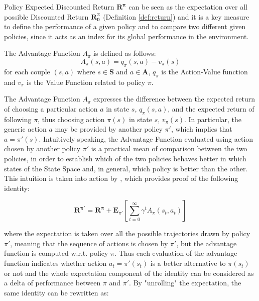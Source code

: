                 Policy Expected Discounted Return $\mathbf{R^{\pi}}$ can be seen as the expectation over all possible Discounted Return $\mathbf{R_{0}^{\pi}}$ (Definition \ref{def:return}) and it is a key measure to define the performance of a given policy and to compare two different given policies, since it acts as an index for its global performance in the environment.
                
                \begin{definition}
                    \label{def:advantagefunction}
                    The Advantage Function $A_{\pi}$ is defined as follows:
                    \[ A_{\pi}\left(s, a\right) = q_{\pi}\left(s, a\right) - v_{\pi}\left(s\right) \]
                    for each couple $(s, a)$ where $s \in \mathbf{S}$ and $a \in \mathbf{A}$, $q_{\pi}$ is the Action-Value function and $v_{\pi}$ is the Value Function related to policy $\pi$.
                \end{definition}
                
                The Advantage Function $A_{\pi}$ expresses the difference between the expected return of choosing a particular action $a$ in state $s$, $q_{\pi}(s, a)$, and the expected return of following $\pi$, thus choosing action $\pi(s)$ in state $s$, $v_{\pi}(s)$. In particular, the generic action $a$ may be provided by another policy $\pi'$, which implies that $a = \pi'(s)$. Intuitively speaking, the Advantage Function evaluated using action chosen by another policy $\pi'$ is a practical mean of comparison between the two policies, in order to establish which of the two policies behaves better in which states of the State Space and, in general, which policy is better than the other. This intuition is taken into action by , which provides proof of the following identity:
                
                \[ \mathbf{R^{\pi'}} = \mathbf{R^{\pi}} + \mathbf{E}_{\pi'} \left[ \sum_{t=0}^\infty \gamma^t A_{\pi}\left(s_t, a_t\right) \right] \]
                
                where the expectation is taken over all the possible trajectories drawn by policy $\pi'$, meaning that the sequence of actions is chosen by $\pi'$, but the advantage function is computed w.r.t. policy $\pi$. Thus each evaluation of the advantage function indicates whether action $a_t = \pi'(s_t)$ is a better alternative to $\pi(s_t)$ or not and the whole expectation component of the identity can be considered as a delta of performance between $\pi$ and $\pi'$. By "unrolling" the expectation, the same identity can be rewritten as: 
                

